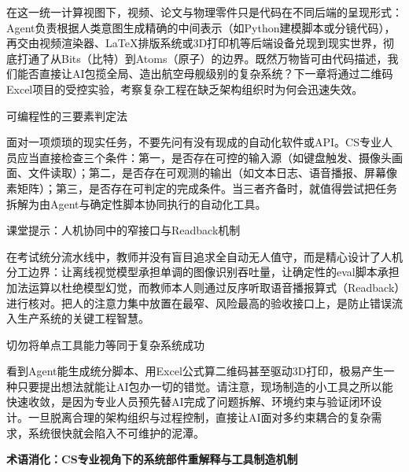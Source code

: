 \documentclass[UTF8,a4paper,11pt,fontset=fandol]{ctexart}
\begin{document}
在这一统一计算视图下，视频、论文与物理零件只是代码在不同后端的呈现形式：Agent负责根据人类意图生成精确的中间表示（如Python建模脚本或分镜代码），再交由视频渲染器、LaTeX排版系统或3D打印机等后端设备兑现到现实世界，彻底打通了从Bits（比特）到Atoms（原子）的边界。既然万物皆可由代码描述，我们能否直接让AI包揽全局、造出航空母舰级别的复杂系统？下一章将通过二维码Excel项目的受控实验，考察复杂工程在缺乏架构组织时为何会迅速失效。

\begin{importantbox}{可编程性的三要素判定法}

面对一项烦琐的现实任务，不要先问有没有现成的自动化软件或API。CS专业人员应当直接检查三个条件：第一，是否存在可控的输入源（如键盘触发、摄像头画面、文件读取）；第二，是否存在可观测的输出（如文本日志、语音播报、屏幕像素矩阵）；第三，是否存在可判定的完成条件。当三者齐备时，就值得尝试把任务拆解为由Agent与确定性脚本协同执行的自动化工具。

\end{importantbox}

\begin{knowledgebox}{课堂提示：人机协同中的窄接口与Readback机制}

在考试统分流水线中，教师并没有盲目追求全自动无人值守，而是精心设计了人机分工边界：让离线视觉模型承担单调的图像识别吞吐量，让确定性的eval脚本承担加法运算以杜绝模型幻觉，而教师本人则通过反序听取语音播报算式（Readback）进行核对。把人的注意力集中放置在最窄、风险最高的验收接口上，是防止错误流入生产系统的关键工程智慧。

\end{knowledgebox}

\begin{warningbox}{切勿将单点工具能力等同于复杂系统成功}

看到Agent能生成统分脚本、用Excel公式算二维码甚至驱动3D打印，极易产生一种只要提出想法就能让AI包办一切的错觉。请注意，现场制造的小工具之所以能快速收敛，是因为专业人员预先替AI完成了问题拆解、环境约束与验证闭环设计。一旦脱离合理的架构组织与过程控制，直接让AI面对多约束耦合的复杂需求，系统很快就会陷入不可维护的泥潭。

\end{warningbox}

\par{}\textbf{术语消化：CS专业视角下的系统部件重解释与工具制造机制}
\end{document}
